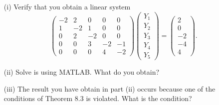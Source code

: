 \documentclass[11pt]{article}
\begin{document}
\begin{enumerate}
\begin{enumerate}
\item[(i)] Verify that you obtain a linear system
\[ \left ( \begin{array}{ccccc} -2 & 2 & 0 & 0 & 0\\
1 & -2 & 1 & 0 & 0\\
0 & 2 & -2 & 0 & 0\\
0 & 0 & 3 & -2 & -1\\
0 & 0 & 0 & 4 & -2\end{array} \right ) \left (\begin{array}{c} Y_1 \\
Y_2\\
Y_3\\
Y_4\\
Y_5\end{array} \right ) = \left (\begin{array}{r} 2 \\
0\\
-2\\
-4\\
4\end{array} \right ).\]

\item[(ii)] Solve is using MATLAB. What do you obtain?
\item[(iii)] The result you have obtain in part (ii) occurs because one of the conditions of Theorem 8.3 is violated.
What is the condition?
\end{enumerate}


\end{enumerate}
\end{document}
